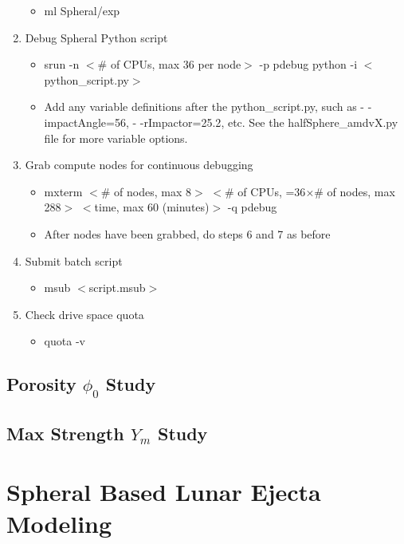 \documentclass{hitec}
\numberwithin{equation}{section}
\begin{document}
\begin{enumerate}
	\begin{itemize}
		\item \textsf{ml Spheral/exp}
	\end{itemize}
	\item Debug Spheral Python script
	\begin{itemize}
		\item \textsf{srun -n $<$\# of CPUs, max 36 per node$>$ -p pdebug python -i $<$python\_script.py$>$}
		\item Add any variable definitions after the \textsf{python\_script.py}, such as \textsf{- -impactAngle=56}, \textsf{- -rImpactor=25.2}, etc. See the \textsf{halfSphere\_amdvX.py} file for more variable options.
	\end{itemize}
	\item Grab compute nodes for continuous debugging
	\begin{itemize}
		\item \textsf{mxterm $<$\# of nodes, max 8$>$ $<$\# of CPUs, =36$\times$\# of nodes, max 288$>$ $<$time, max 60 (minutes)$>$ -q pdebug}
		\item After nodes have been grabbed, do steps 6 and 7 as before 
	\end{itemize}
	\item Submit batch script
	\begin{itemize}
		\item \textsf{msub} $<$script.msub$>$
	\end{itemize}
	\item Check drive space quota
	\begin{itemize}
		\item \textsf{quota -v}
	\end{itemize}
\end{enumerate}


\subsection{Porosity $\phi_0$ Study}




\subsection{Max Strength $Y_m$ Study}


\section{Spheral Based Lunar Ejecta Modeling}
\label{sec:Spheral Based Lunar Ejecta Modeling}
\end{document}
